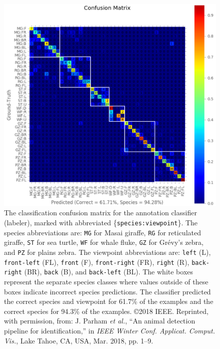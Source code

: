 \begin{figure}[!t]
    \begin{center}
        \includegraphics[width=0.92\linewidth]{resources/labeler-confusion.pdf}
    \end{center}
    \caption{The classification confusion matrix for the annotation classifier (labeler), marked with abbreviated \{\texttt{species:viewpoint}\}.  The species abbreviations are: \texttt{MG} for Masai giraffe, \texttt{RG} for reticulated giraffe, \texttt{ST} for sea turtle, \texttt{WF} for whale fluke, \texttt{GZ} for Gr\'evy's zebra, and \texttt{PZ} for plains zebra.  The viewpoint abbreviations are: \texttt{left} (L), \texttt{front-left} (FL), \texttt{front} (F), \texttt{front-right} (FR), \texttt{right} (R), \texttt{back-right} (BR), \texttt{back} (B), and \texttt{back-left} (BL).  The white boxes represent the separate species classes where values outside of these boxes indicate incorrect species predictions.  The classifier predicted the correct species and viewpoint for 61.7\% of the examples and the correct species for 94.3\% of the examples.  \copyright 2018 IEEE. Reprinted, with permission, from: J. Parham \textit{et al.}, ``An animal detection pipeline for identification,'' in \textit{IEEE Winter Conf. Applicat. Comput. Vis.}, Lake Tahoe, CA, USA, Mar. 2018, pp. 1–9.}
    \label{fig:labeler-confusion}
\end{figure}

